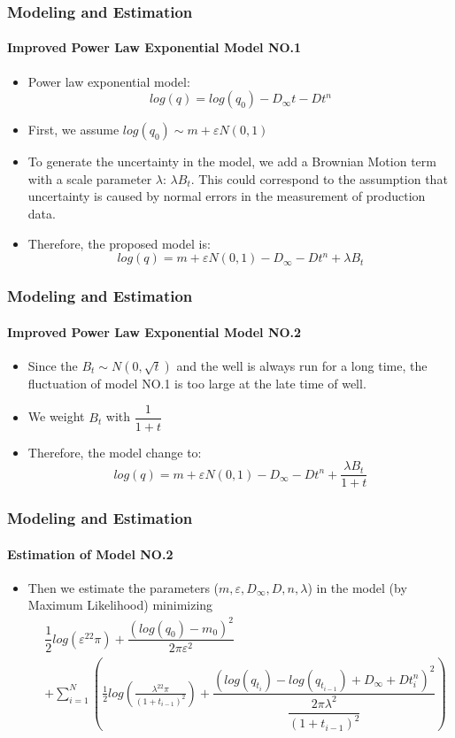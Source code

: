 \documentclass[11pt]{beamer}
\begin{document}
				
\begin{frame}
	\frametitle{Modeling and Estimation}
	\framesubtitle{Improved Power Law Exponential Model NO.1}
	\justifying
	\begin{itemize}
		\item Power law exponential model:
		      \begin{equation}
		      	log(q)=log(q_0)-D_\infty t - Dt^n
		      \end{equation}
		\item First, we assume $log(q_0)\sim m+\varepsilon N(0,1)$
		\item To generate the uncertainty in the model, we add a Brownian Motion term with a scale parameter $\lambda$:
		      $\lambda B_t$.  This could correspond to the assumption that uncertainty is caused by normal errors in the measurement of production data.
		\item Therefore, the proposed model is:
		      \begin{equation}
		      	log(q)=m+\varepsilon N(0,1)-D_\infty - Dt^n+\lambda B_t
		      \end{equation}
	\end{itemize}		
\end{frame}		


\begin{frame}
	\frametitle{Modeling and Estimation}
	\framesubtitle{Improved Power Law Exponential Model NO.2}
	\justifying
	\begin{itemize}
		\item Since the $B_t\sim N(0,\sqrt{t})$ and the well is always run for a long time, the fluctuation of model NO.1 is too large at the late time of well.
		\item We weight $B_t$ with $\dfrac{1}{1+t}$
		\item Therefore, the model change to:
		      \begin{equation}
		      	log(q)=m+\varepsilon N(0,1)-D_\infty - Dt^n+\dfrac{\lambda B_t}{1+t}
		      \end{equation}
	\end{itemize}		
\end{frame}		


\begin{frame}
	\frametitle{Modeling and Estimation}
	\framesubtitle{Estimation of Model NO.2}
	\justifying
	\begin{itemize}
		\item Then we estimate the parameters ($m,\varepsilon,D_\infty,D,n,\lambda$) in the model (by Maximum Likelihood)  minimizing
		      \begin{eqnarray*}
		      	&\dfrac{1}{2}log(\varepsilon^22\pi)+\dfrac{(log(q_0)-m_0)^2}{2 \pi \varepsilon^2} \\
		      	&+\sum_{i=1}^N\left(\frac{1}{2}log\left(\frac{\lambda^22\pi}{(1+t_{i-1})^2}\right)+\dfrac{(log(q_{t_i})-log(q_{t_{i-1}})+D_\infty+Dt_i^n)^2}{\dfrac{2\pi\lambda^2}{(1+t_{i-1})^2}}\right)
		      \end{eqnarray*}
	\end{itemize}		
\end{frame}		
	
\end{document}
